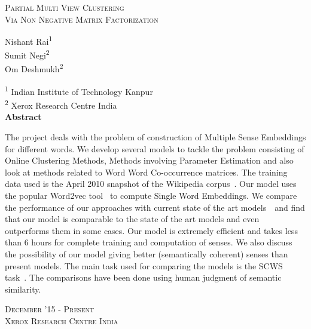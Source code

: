 \documentclass[a4paper]{article}
\begin{document}
	\begin{titlepage}
	    \begin{center}
	        \vspace*{1cm}
	        
	       	\huge{\textsc{Partial Multi View Clustering}}\\
			\Large{\textsc{Via Non Negative Matrix Factorization}}	

	        \vspace{8mm}
	        \large{Nishant Rai\textsuperscript{1}}\\
			\large{Sumit Negi\textsuperscript{2}}\\
			\large{Om Deshmukh\textsuperscript{2}}\\
			\vspace{3mm}
			
			{\normalsize{\textsuperscript{1} Indian Institute of Technology Kanpur\\}}
			{\normalsize{\textsuperscript{2} Xerox Research Centre India\\}}
	        \vspace{4mm}
        	\vspace{7mm}
	        \textbf{Abstract\\}
        	\vspace{4mm}
        	\noindent
{\justifying\small{The project deals with the problem of construction of Multiple Sense Embeddings for different words. We develop several models to tackle the problem consisting of Online Clustering Methods, Methods involving Parameter Estimation and also look at methods related to Word Word Co-occurrence matrices. The training data used is the April 2010 snapshot of the Wikipedia corpus~\cite{wiki}. Our model uses the popular Word2vec tool~\cite{word2vec} to compute Single Word Embeddings. We compare the performance of our approaches with current state of the art models~\cite{huang}~\cite{neel}and find that our model is comparable to the state of the art models and even outperforms them in some cases. Our model is extremely efficient and takes less than 6 hours for complete training and computation of senses. We also discuss the possibility of our model giving better (semantically coherent) senses than present models. The main task used for comparing the models is the SCWS task~\cite{huang}. The comparisons have been done using human judgment of semantic similarity.} \par}
			\vfill
            \vspace{3mm}
            \large\textsc{December '15 - Present\\}
            \vspace{1mm}
            \large\textsc{Xerox Research Centre India}
	    \end{center}
	\end{titlepage}
	\restoregeometry
\end{document}
